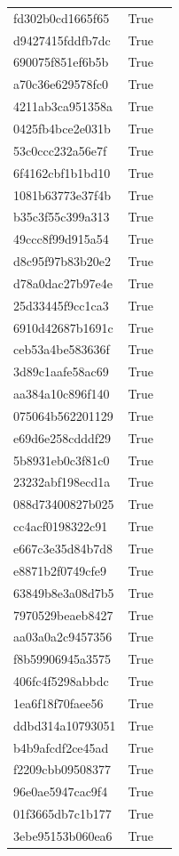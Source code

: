\begin{tabular}{lrl}
fd302b0cd1665f65 & True &  \\
d9427415fddfb7dc & True &  \\
690075f851ef6b5b & True &  \\
a70c36e629578fc0 & True &  \\
4211ab3ca951358a & True &  \\
0425fb4bce2e031b & True &  \\
53c0ccc232a56e7f & True &  \\
6f4162cbf1b1bd10 & True &  \\
1081b63773e37f4b & True &  \\
b35c3f55c399a313 & True &  \\
49ccc8f99d915a54 & True &  \\
d8c95f97b83b20e2 & True &  \\
d78a0dac27b97e4e & True &  \\
25d33445f9cc1ca3 & True &  \\
6910d42687b1691c & True &  \\
ceb53a4be583636f & True &  \\
3d89c1aafe58ac69 & True &  \\
aa384a10c896f140 & True &  \\
075064b562201129 & True &  \\
e69d6e258cdddf29 & True &  \\
5b8931eb0c3f81c0 & True &  \\
23232abf198ecd1a & True &  \\
088d73400827b025 & True &  \\
cc4acf0198322c91 & True &  \\
e667c3e35d84b7d8 & True &  \\
e8871b2f0749cfe9 & True &  \\
63849b8e3a08d7b5 & True &  \\
7970529beaeb8427 & True &  \\
aa03a0a2c9457356 & True &  \\
f8b59906945a3575 & True &  \\
406fc4f5298abbdc & True &  \\
1ea6f18f70faee56 & True &  \\
ddbd314a10793051 & True &  \\
b4b9afcdf2ce45ad & True &  \\
f2209cbb09508377 & True &  \\
96e0ae5947cac9f4 & True &  \\
01f3665db7c1b177 & True &  \\
3ebe95153b060ea6 & True &  \\

\end{tabular}
